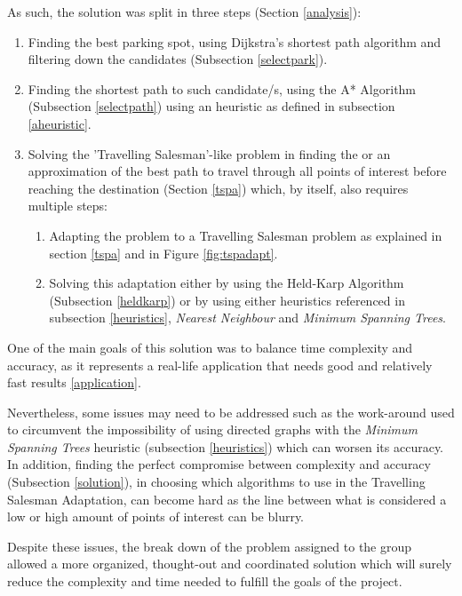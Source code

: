 \documentclass[a4paper, 12pt]{report}
\begin{document}
    As such, the solution was split in three steps (Section \ref{analysis}): 
    \begin{enumerate}
        \item Finding the best parking spot, using Dijkstra's shortest path algorithm and filtering down the candidates (Subsection \ref{selectpark}). 
        \item Finding the shortest path to such candidate/s, using the A* Algorithm (Subsection \ref{selectpath}) using an heuristic as defined in subsection \ref{aheuristic}.
        \item Solving the 'Travelling Salesman'-like problem in finding the or an approximation of the best path to travel through all points of interest before reaching the destination (Section \ref{tspa}) which, by itself, also requires multiple steps:
        \begin{enumerate}
            \item Adapting the problem to a Travelling Salesman problem as explained in section \ref{tspa} and in Figure \ref{fig:tspadapt}.
            \item Solving this adaptation either by using the Held-Karp Algorithm (Subsection \ref{heldkarp}) or by using either heuristics referenced in subsection \ref{heuristics}, \textit{Nearest Neighbour} and \textit{Minimum Spanning Trees}.
        \end{enumerate}
    \end{enumerate}
    
    One of the main goals of this solution was to balance time complexity and accuracy, as it represents a real-life application that needs good and relatively fast results \ref{application}.
    
    Nevertheless, some issues may need to be addressed such as the work-around used to circumvent the impossibility of using directed graphs with the \textit{Minimum Spanning Trees} heuristic (subsection \ref{heuristics}) which can worsen its accuracy. In addition, finding the perfect compromise between complexity and accuracy (Subsection \ref{solution}), in choosing which algorithms to use in the Travelling Salesman Adaptation, can become hard as the line between what is considered a low or high amount of points of interest can be blurry.
    
    Despite these issues, the break down of the problem assigned to the group allowed a more organized, thought-out and coordinated solution which will surely reduce the complexity and time needed to fulfill the goals of the project.
    
\end{document}
